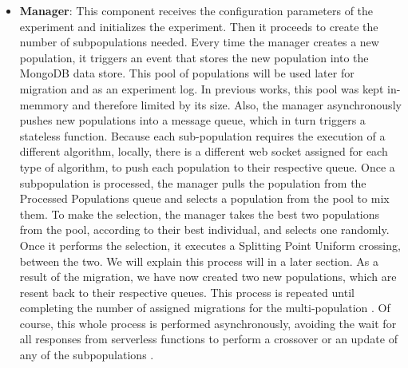\documentclass[runningheads]{llncs}
\begin{document}
\begin{itemize}
  \item {\bf Manager}: This component receives the configuration parameters of
  the experiment and initializes the experiment. Then it proceeds to create the
  number of subpopulations needed. Every time the manager creates a new
  population, it triggers an event that stores the new population into the
  MongoDB data store. This pool of populations will be used later for migration
  and as an experiment log. In previous works, this pool was kept in-memmory and
  therefore limited by its size. 
  Also, the manager asynchronously pushes new populations into a message queue,
  which in turn triggers a stateless function. Because each sub-population
  requires the execution of a different algorithm, locally, there is a different
  web socket assigned for each type of algorithm, to push each population to
  their respective queue. Once a subpopulation is processed, the manager pulls
  the population from the Processed Populations queue and selects a population
  from the pool to mix them. To make the selection, the manager takes the best
  two populations from the pool, according to their best individual, and selects
  one randomly. Once it performs the selection, it executes a Splitting Point
  Uniform crossing, between the two. We will explain this process will in a
  later section.  As a result of the migration, we have now created two new
  populations, which are resent back to their respective queues. This process is
  repeated until completing the number of assigned migrations for the
  multi-population \cite{Ma2019,Santander-jim2018}. Of course, this whole
  process is performed asynchronously, avoiding the wait for all responses from
  serverless functions to perform a crossover or an update of any of the
  subpopulations \cite{Lovbjerg2001,Jimeno2019}. 
  

\end{itemize}
\end{document}
